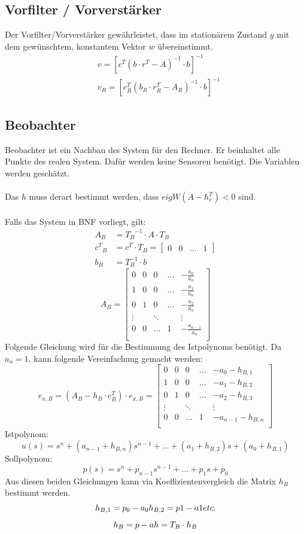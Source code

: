 \subsection{Vorfilter / Vorverstärker}
Der Vorfilter/Vorverstärker gewährleistet, dass im stationärem Zustand $y$ mit dem gewünschtem, konstantem Vektor $w$ übereinstimmt.
\[\begin{aligned}
	 	&v=[c^T(b\cdot r^T-A)^{-1}\cdot b]^{-1} \\
	 	&v_R=[c^T_R(b_R\cdot r^T_R-A_R)^{-1}\cdot b]^{-1}
\end{aligned}\]
\subsection{Beobachter}
Beobachter ist ein Nachbau des System für den Rechner. Er beinhaltet alle Punkte des realen System. Dafür werden keine Sensoren benötigt. Die Variablen werden geschätzt.\\
\\
Das $h$ muss derart bestimmt werden, dass $eigW(A-h_c^T)<0$ sind.\\
\\
Falls das System in BNF vorliegt, gilt:
\[\begin{aligned}
	A_B &= {T_B}^{-1}\cdot A \cdot T_B	\\	
	{c^T}_B &= c^T\cdot T_B = \begin{bmatrix}
		0 & 0 & \ldots & 1
	\end{bmatrix}	\\	
	b_B &= T_B^{-1}\cdot b
\end{aligned}\]
\[
	A_B= \begin{bmatrix}
		0 &	0 & 0 & \ldots & -\frac{a_0}{a_n}\\
		1 & 0 & 0 & \ldots & -\frac{a_1}{a_n}\\
		0 & 1 & 0 & \ldots & -\frac{a_2}{a_n}\\
		\vdots &  & \ddots &  & \vdots \\
		0 & 0 & \ldots & 1 &-\frac{a_{n-1}}{a_n}\\	
	\end{bmatrix}
\]
Folgende Gleichung wird für die Bestimmung des Istpolynoms benötigt. Da $a_n=1$, kann folgende Vereinfachung gemacht werden:
\[
	\dot{e}_{x,B}=(A_B-h_B\cdot c_B^T)\cdot e_{x,B}=
	\begin{bmatrix}
		0 &	0 & 0 & \ldots & -a_0-h_{B,1}\\
		1 & 0 & 0 & \ldots & -a_1-h_{B,2}\\
		0 & 1 & 0 & \ldots & -a_2-h_{B,3}\\
		\vdots &  & \ddots &  & \vdots \\
		0 & 0 & \ldots & 1 &-a_{n-1}-h_{B,n}\\	
	\end{bmatrix}
\]
Istpolynom:
\[
	u(s)=s^n+(a_{n-1}+h_{B,n})s^{n-1}+...+(a_1+h_{B,2})s+(a_0+h_{B,1})
\]
Sollpolynom:
\[
	p(s)=s^n+p_{n-1}s^{n-1}+...+p_1 s+p_0
\]
Aus diesen beiden Gleichungen kann via Koeffizientenvergleich die Matrix $h_B$ bestimmt werden.
\[
	h_{B,1}=p_0-a_0	\\	h_{B,2}=p1-a1	\\	etc.	
\]
\[
	h_B=p-a \\ h=T_B\cdot h_B \\
\]
